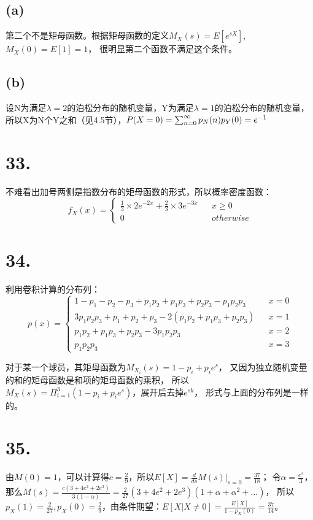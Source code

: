 \documentclass[UTF8]{report}
\begin{document}
        \subsection*{(a)}
            第二个不是矩母函数。根据矩母函数的定义$M_X(s) = E[e^{sX}]$,$M_X(0) = E[1] = 1$，
            很明显第二个函数不满足这个条件。
        \subsection*{(b)}
            设N为满足$\lambda = 2$的泊松分布的随机变量，Y为满足$\lambda = 1$的泊松分布的随机变量，
            所以X为N个Y之和（见4.5节），$P(X = 0) = \sum_{n = 0}^{\infty}p_N(n)p_Y(0)\\ = e^{-1}$
    \section*{33.}
        不难看出加号两侧是指数分布的矩母函数的形式，所以概率密度函数：
        $$f_X(x) = \left\{
            \begin{array}{lcr}
                \frac{1}{3} \times 2e^{-2x} + \frac{2}{3} \times 3e^{-3x} & & x \geq 0\\
                0 & & otherwise
            \end{array}
        \right.$$
    \section*{34.}
        利用卷积计算的分布列：
        $$p(x) = \left\{
            \begin{array}{lcr}
                1 - p_1 - p_2 - p_3 + p_1p_2 + p_1p_3 + p_2p_3 - p_1p_2p_3 & & x = 0\\
                3p_1p_2p_3 + p_1 + p_2 + p_3 - 2(p_1p_2 + p_1p_3 + p_2p_3) & & x = 1\\
                p_1p_2 + p_1p_3 + p_2p_3 - 3p_1p_2p_3 & & x = 2\\
                p_1p_2p_3 & & x = 3
            \end{array}
        \right.$$

        对于某一个球员，其矩母函数为$M_{X_i}(s) = 1 - p_i + p_ie^s$，
        又因为独立随机变量的和的矩母函数是和项的矩母函数的乘积，
        所以$M_X(s) = \Pi_{i = 1}^{3}(1 - p_i + p_ie^s)$，展开后去掉$e^{sk}$，
        形式与上面的分布列是一样的。
    \section*{35.}
        由$M(0) = 1$，可以计算得$c = \frac{2}{9}$，所以$E[X] = \frac{d}{ds}M(s)|_{s = 0} = \frac{37}{18}$；
        令$\alpha = \frac{e^s}{3}$，那么$M(s) = \frac{c(3 + 4e^2 + 2e^3)}{3(1 - \alpha)} = \frac{2}{27}(3 + 4e^2 + 2e^3)(1 + \alpha + \alpha^2 + \dots)$，
        所以$p_X(1) = \frac{2}{27}, p_X(0) = \frac{2}{9}$，由条件期望：$E[X|X \ne 0] = \frac{E[X]}{1 - p_X(0)} = \frac{37}{14}$。
\end{document}
